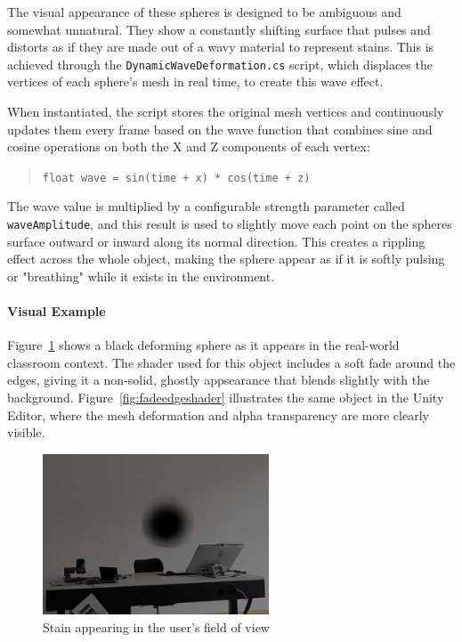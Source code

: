\vspace{1em}

The visual appearance of these spheres is designed to be ambiguous and somewhat unnatural. They show a constantly shifting surface that pulses and distorts as if they are made out of a wavy material to represent stains. This is achieved through the \texttt{DynamicWaveDeformation.cs} script, which displaces the vertices of each sphere's mesh in real time, to create this wave effect.

\vspace{1em}

When instantiated, the script stores the original mesh vertices and continuously updates them every frame based on the wave function that combines sine and cosine operations on both the X and Z components of each vertex:

\begin{quote}
\texttt{float wave = sin(time + x) * cos(time + z)}
\end{quote}

The wave value is multiplied by a configurable strength parameter called \texttt{waveAmplitude}, and this result is used to slightly move each point on the spheres surface outward or inward along its normal direction. This creates a rippling effect across the whole object, making the sphere appear as if it is softly pulsing or "breathing" while it exists in the environment.


\paragraph{Visual Example}
Figure~\ref{fig:stain} shows a black deforming sphere as it appears in the real-world classroom context. The shader used for this object includes a soft fade around the edges, giving it a non-solid, ghostly appsearance that blends slightly with the background. Figure~\ref{fig:fadeedgeshader} illustrates the same object in the Unity Editor, where the mesh deformation and alpha transparency are more clearly visible.

\begin{figure}[h!] 
    \centering 
    \includegraphics[width=0.6\textwidth]{../../Figures/stain-video.jpg} 
    \caption{Stain appearing in the user's field of view} 
    \label{fig:stain} 
\end{figure}


